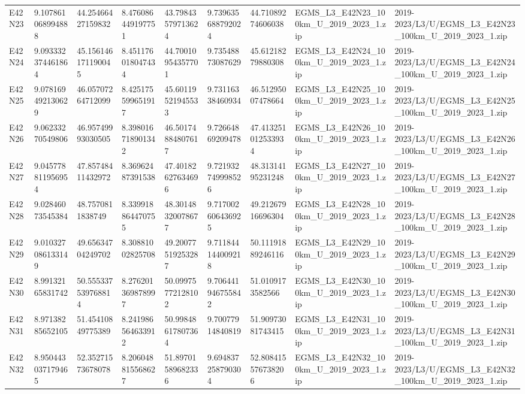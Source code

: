 \begin{landscape}
\begin{longtable}{lllllllll}
E42N23 & 9.107861068994888 & 44.25466427159832 & 8.476086449197751 & 43.79843579713624 & 9.739635688792024 & 44.71089274606038 & EGMS\_L3\_E42N23\_100km\_U\_2019\_2023\_1.zip & 2019-2023/L3/U/EGMS\_L3\_E42N23\_100km\_U\_2019\_2023\_1.zip \\
E42N24 & 9.093332374461864 & 45.156146171190045 & 8.451176018047434 & 44.70010954357701 & 9.73548873087629 & 45.61218279880308 & EGMS\_L3\_E42N24\_100km\_U\_2019\_2023\_1.zip & 2019-2023/L3/U/EGMS\_L3\_E42N24\_100km\_U\_2019\_2023\_1.zip \\
E42N25 & 9.078169492130629 & 46.05707264712099 & 8.425175599651917 & 45.60119521945533 & 9.73116338460934 & 46.51295007478664 & EGMS\_L3\_E42N25\_100km\_U\_2019\_2023\_1.zip & 2019-2023/L3/U/EGMS\_L3\_E42N25\_100km\_U\_2019\_2023\_1.zip \\
E42N26 & 9.06233270549806 & 46.95749993030505 & 8.398016718901342 & 46.50174884807617 & 9.72664869209478 & 47.413251012533934 & EGMS\_L3\_E42N26\_100km\_U\_2019\_2023\_1.zip & 2019-2023/L3/U/EGMS\_L3\_E42N26\_100km\_U\_2019\_2023\_1.zip \\
E42N27 & 9.045778811956954 & 47.85748411432972 & 8.36962487391538 & 47.40182627634696 & 9.721932749998526 & 48.31314195231248 & EGMS\_L3\_E42N27\_100km\_U\_2019\_2023\_1.zip & 2019-2023/L3/U/EGMS\_L3\_E42N27\_100km\_U\_2019\_2023\_1.zip \\
E42N28 & 9.02846073545384 & 48.7570811838749 & 8.339918864470755 & 48.30148320078677 & 9.717002606436925 & 49.21267916696304 & EGMS\_L3\_E42N28\_100km\_U\_2019\_2023\_1.zip & 2019-2023/L3/U/EGMS\_L3\_E42N28\_100km\_U\_2019\_2023\_1.zip \\
E42N29 & 9.010327086133149 & 49.65634704249702 & 8.30881002825708 & 49.20077519253287 & 9.711844144009218 & 50.11191889246116 & EGMS\_L3\_E42N29\_100km\_U\_2019\_2023\_1.zip & 2019-2023/L3/U/EGMS\_L3\_E42N29\_100km\_U\_2019\_2023\_1.zip \\
E42N30 & 8.99132165831742 & 50.555337539768814 & 8.276201369878997 & 50.09975772128102 & 9.706441946755842 & 51.0109173582566 & EGMS\_L3\_E42N30\_100km\_U\_2019\_2023\_1.zip & 2019-2023/L3/U/EGMS\_L3\_E42N30\_100km\_U\_2019\_2023\_1.zip \\
E42N31 & 8.97138285652105 & 51.45410849775389 & 8.241986564633912 & 50.99848617807364 & 9.70077914840819 & 51.90973081743415 & EGMS\_L3\_E42N31\_100km\_U\_2019\_2023\_1.zip & 2019-2023/L3/U/EGMS\_L3\_E42N31\_100km\_U\_2019\_2023\_1.zip \\
E42N32 & 8.950443037179465 & 52.35271573678078 & 8.206048815568627 & 51.89701589682336 & 9.694837258790304 & 52.808415576738206 & EGMS\_L3\_E42N32\_100km\_U\_2019\_2023\_1.zip & 2019-2023/L3/U/EGMS\_L3\_E42N32\_100km\_U\_2019\_2023\_1.zip \\

\end{longtable}
\end{landscape}
